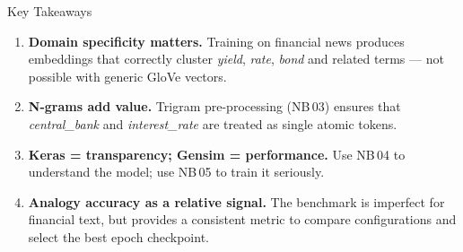 \documentclass[11pt,aspectratio=169,professionalfonts]{beamer}
\begin{document}
%
%
\begin{frame}{Key Takeaways}

  \begin{enumerate}
    \setlength\itemsep{0.7em}
    \item \textbf{Domain specificity matters.}
          Training on financial news produces embeddings that correctly
          cluster \textit{yield}, \textit{rate}, \textit{bond} and
          related terms — not possible with generic GloVe vectors.

    \item \textbf{N-grams add value.}
          Trigram pre-processing (NB\,03) ensures that
          \textit{central\_bank} and \textit{interest\_rate}
          are treated as single atomic tokens.

    \item \textbf{Keras = transparency; Gensim = performance.}
          Use NB\,04 to understand the model;
          use NB\,05 to train it seriously.

    \item \textbf{Analogy accuracy as a relative signal.}
          The benchmark is imperfect for financial text,
          but provides a consistent metric to compare
          configurations and select the best epoch checkpoint.
  \end{enumerate}

\end{frame}
%
%
\end{document}
